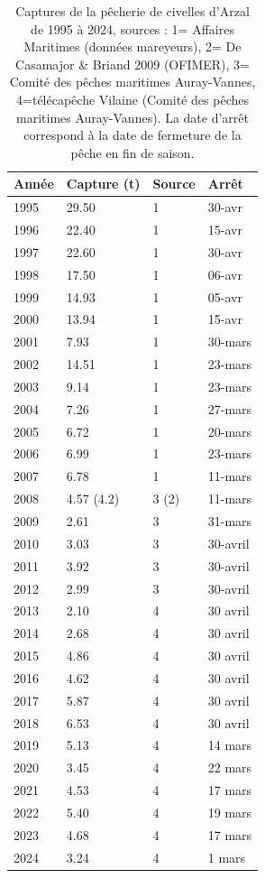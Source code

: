 \documentclass[10pt,twocolumn,titlepage,twoside]{article}\usepackage[]{graphicx}\usepackage[]{xcolor}
\begin{document}
\begin{table}[htpb]
\centering
\caption{Captures de la pêcherie de civelles d'Arzal de 1995 à 2024, sources : 
1= Affaires Maritimes (données mareyeurs), 
2= De Casamajor \& Briand 2009 (OFIMER),
3= Comité des pêches maritimes Auray-Vannes,
4=télécapêche Vilaine (Comité des pêches maritimes Auray-Vannes). 
La date d'arrêt correspond à la date de fermeture de la pêche en fin de saison.}
\label{tableau_captures}
\begin{tabular}{llll}
\toprule
Année & Capture (t) & Source & Arrêt \\ 
\midrule
1995  & 29.50  &  1 & 30-avr \\
1996  & 22.40  &  1 & 15-avr \\
1997  & 22.60  &  1 & 30-avr \\
1998  & 17.50  &  1 & 06-avr \\
1999  & 14.93  &  1 & 05-avr \\
2000  & 13.94  &  1 & 15-avr \\
2001  & 7.93   &  1 & 30-mars \\
2002  & 14.51  &  1 & 23-mars \\
2003  & 9.14 &  1   & 23-mars \\
2004  & 7.26 &  1  & 27-mars \\
2005  & 6.72 &  1  & 20-mars \\
2006  & 6.99 &  1  & 23-mars \\
2007  & 6.78 &  1  & 11-mars \\
2008  & 4.57 (4.2) & 3 (2) & 11-mars\\
2009  & 2.61 & 3  & 31-mars \\
2010  & 3.03 & 3 & 30-avril \\
2011  & 3.92 & 3  & 30-avril \\
2012  & 2.99 & 3  & 30-avril \\
2013  & 2.10 & 4  & 30 avril \\
2014  & 2.68 & 4  & 30 avril \\
2015  & 4.86 & 4  & 30 avril \\
2016  & 4.62 & 4 &  30 avril\\  %
2017  & 5.87 & 4  & 30 avril \\ 
2018 & 6.53 &  4  & 30 avril \\ 
2019 & 5.13 &  4  &  14 mars\\ 
2020 & 3.45 &  4  &  22 mars \\ 
2021 & 4.53 &  4  &  17 mars \\
2022  & 5.40 & 4 & 19 mars \\ 
2023  & 4.68 & 4 & 17 mars \\
2024  & 3.24 & 4  & 1 mars  \\
\bottomrule
\end{tabular}
\end{table}
\normalsize
\end{document}
